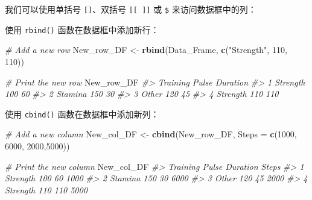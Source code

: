 \documentclass[
]{book}
\newenvironment{Shaded}{\begin{snugshade}}{\end{snugshade}}
\newcommand{\AttributeTok}[1]{\textcolor[rgb]{0.13,0.29,0.53}{#1}}
\newcommand{\CommentTok}[1]{\textcolor[rgb]{0.56,0.35,0.01}{\textit{#1}}}
\newcommand{\DecValTok}[1]{\textcolor[rgb]{0.00,0.00,0.81}{#1}}
\newcommand{\FunctionTok}[1]{\textcolor[rgb]{0.13,0.29,0.53}{\textbf{#1}}}
\newcommand{\NormalTok}[1]{#1}
\newcommand{\OtherTok}[1]{\textcolor[rgb]{0.56,0.35,0.01}{#1}}
\newcommand{\SpecialCharTok}[1]{\textcolor[rgb]{0.81,0.36,0.00}{\textbf{#1}}}
\newcommand{\StringTok}[1]{\textcolor[rgb]{0.31,0.60,0.02}{#1}}
\begin{document}
我们可以使用单括号 \texttt{{[}{]}}、双括号 \texttt{{[}{[}\ {]}{]}} 或 \texttt{\$} 来访问数据框中的列：

\begin{Shaded}
\end{Shaded}

使用 \texttt{rbind()} 函数在数据框中添加新行：

\begin{Shaded}
\begin{Highlighting}[]
\CommentTok{\# Add a new row}
\NormalTok{New\_row\_DF }\OtherTok{\textless{}{-}} \FunctionTok{rbind}\NormalTok{(Data\_Frame, }\FunctionTok{c}\NormalTok{(}\StringTok{"Strength"}\NormalTok{, }\DecValTok{110}\NormalTok{, }\DecValTok{110}\NormalTok{))}

\CommentTok{\# Print the new row}
\NormalTok{New\_row\_DF}
\CommentTok{\#\textgreater{}   Training Pulse Duration}
\CommentTok{\#\textgreater{} 1 Strength   100       60}
\CommentTok{\#\textgreater{} 2  Stamina   150       30}
\CommentTok{\#\textgreater{} 3    Other   120       45}
\CommentTok{\#\textgreater{} 4 Strength   110      110}
\end{Highlighting}
\end{Shaded}

使用 \texttt{cbind()} 函数在数据框中添加新列：

\begin{Shaded}
\begin{Highlighting}[]
\CommentTok{\# Add a new column}
\NormalTok{New\_col\_DF }\OtherTok{\textless{}{-}} \FunctionTok{cbind}\NormalTok{(New\_row\_DF, }\AttributeTok{Steps =} \FunctionTok{c}\NormalTok{(}\DecValTok{1000}\NormalTok{, }\DecValTok{6000}\NormalTok{, }\DecValTok{2000}\NormalTok{,}\DecValTok{5000}\NormalTok{))}

\CommentTok{\# Print the new column}
\NormalTok{New\_col\_DF}
\CommentTok{\#\textgreater{}   Training Pulse Duration Steps}
\CommentTok{\#\textgreater{} 1 Strength   100       60  1000}
\CommentTok{\#\textgreater{} 2  Stamina   150       30  6000}
\CommentTok{\#\textgreater{} 3    Other   120       45  2000}
\CommentTok{\#\textgreater{} 4 Strength   110      110  5000}
\end{Highlighting}
\end{Shaded}
\end{document}
